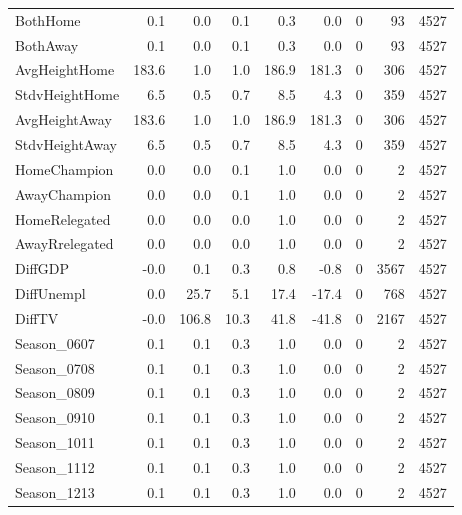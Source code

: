 \documentclass[11pt]{article}
\begin{document}
\begin{table}[h!]
{\begin{tabular}{lrrrrrrrr}
				BothHome       &    0.1 &    0.0 &   0.1 &    0.3 &    0.0 &        0 &      93 &   4527 \\
				BothAway       &    0.1 &    0.0 &   0.1 &    0.3 &    0.0 &        0 &      93 &   4527 \\
				AvgHeightHome  &  183.6 &    1.0 &   1.0 &  186.9 &  181.3 &        0 &     306 &   4527 \\
				StdvHeightHome &    6.5 &    0.5 &   0.7 &    8.5 &    4.3 &        0 &     359 &   4527 \\
				AvgHeightAway  &  183.6 &    1.0 &   1.0 &  186.9 &  181.3 &        0 &     306 &   4527 \\
				StdvHeightAway &    6.5 &    0.5 &   0.7 &    8.5 &    4.3 &        0 &     359 &   4527 \\
				HomeChampion   &    0.0 &    0.0 &   0.1 &    1.0 &    0.0 &        0 &       2 &   4527 \\
				AwayChampion   &    0.0 &    0.0 &   0.1 &    1.0 &    0.0 &        0 &       2 &   4527 \\
				HomeRelegated  &    0.0 &    0.0 &   0.0 &    1.0 &    0.0 &        0 &       2 &   4527 \\
				AwayRrelegated &    0.0 &    0.0 &   0.0 &    1.0 &    0.0 &        0 &       2 &   4527 \\
				DiffGDP        &   -0.0 &    0.1 &   0.3 &    0.8 &   -0.8 &        0 &    3567 &   4527 \\
				DiffUnempl     &    0.0 &   25.7 &   5.1 &   17.4 &  -17.4 &        0 &     768 &   4527 \\
				DiffTV         &   -0.0 &  106.8 &  10.3 &   41.8 &  -41.8 &        0 &    2167 &   4527 \\
				Season\_0607    &    0.1 &    0.1 &   0.3 &    1.0 &    0.0 &        0 &       2 &   4527 \\
				Season\_0708    &    0.1 &    0.1 &   0.3 &    1.0 &    0.0 &        0 &       2 &   4527 \\
				Season\_0809    &    0.1 &    0.1 &   0.3 &    1.0 &    0.0 &        0 &       2 &   4527 \\
				Season\_0910    &    0.1 &    0.1 &   0.3 &    1.0 &    0.0 &        0 &       2 &   4527 \\
				Season\_1011    &    0.1 &    0.1 &   0.3 &    1.0 &    0.0 &        0 &       2 &   4527 \\
				Season\_1112    &    0.1 &    0.1 &   0.3 &    1.0 &    0.0 &        0 &       2 &   4527 \\
				Season\_1213    &    0.1 &    0.1 &   0.3 &    1.0 &    0.0 &        0 &       2 &   4527 \\

\end{tabular}}
\end{table}
\end{document}
